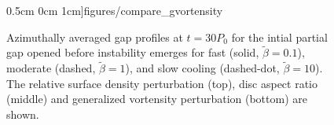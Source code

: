 \begin{figure}
    0.5cm 0cm 1cm]{figures/compare_gvortensity}
  \caption{Azimuthally averaged gap profiles at $t=30P_0$ for the
    intial partial gap opened before instability emerges for fast
    (solid, $\tilde{\beta}=0.1$), moderate
    (dashed,  $\tilde{\beta}=1$), and slow cooling (dashed-dot,
    $\tilde{\beta}=10$). The relative surface density 
    perturbation (top), disc aspect ratio (middle) and generalized
    vortensity perturbation (bottom) are shown. \label{intial1D}}  
\end{figure}




